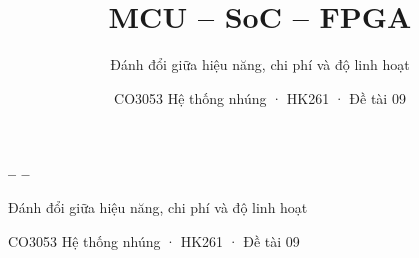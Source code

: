 \documentclass[aspectratio=169,11pt]{beamer}
\title{\textbf{MCU – SoC – FPGA}}
\subtitle{Đánh đổi giữa hiệu năng, chi phí và độ linh hoạt}
\author{CO3053 Hệ thống nhúng · HK261 · Đề tài 09}
\date{}
\begin{document}
\begin{frame}[plain]
\vfill
{\Huge\bfseries \MCU{} – \SoC{} – \FPGA}\par\medskip
{\Large Đánh đổi giữa hiệu năng, chi phí và độ linh hoạt}\par\bigskip
{\color{cInk2} CO3053 Hệ thống nhúng · HK261 · Đề tài 09}
\vfill
\end{frame}


\end{document}
